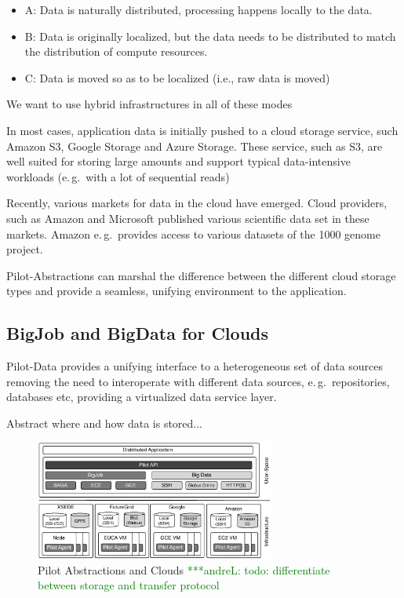 \documentclass[times]{cpeauth}
\newcommand{\alnote}[1]{ {\textcolor{green} { ***andreL: #1 }}}
\newcommand{\alnote}[1]{}
\begin{document}
\begin{itemize}
\item A: Data is naturally distributed, processing happens locally to the data. 
\item B: Data is originally localized, but the data needs to be distributed to match the distribution of compute resources.
\item C: Data is moved so as to be localized (i.e., raw data is moved)
\end{itemize}
We want to use hybrid infrastructures in all of these modes 



In most cases, application data is initially pushed to a cloud storage 
service, such Amazon S3, Google Storage and Azure Storage. These service, such 
as S3, are well suited for storing large amounts and support typical 
data-intensive workloads (e.\,g.\ with a lot of sequential reads)

Recently, various markets for data in the cloud have emerged. Cloud providers,
such as Amazon and Microsoft published various scientific data set in these
markets. Amazon e.\,g.\ provides access to various datasets of the 1000 genome
project.



Pilot-Abstractions can marshal the difference between the different cloud storage types and provide a seamless, unifying environment to the application.


\subsection{BigJob and BigData for Clouds}

Pilot-Data provides a unifying interface to a heterogeneous set of data 
sources removing the need to interoperate with different data sources, e.\,g.\ 
repositories, databases etc, providing a virtualized data service layer.

Abstract where and how data is stored...



\begin{figure}[t]
	\centering
		\includegraphics[width=0.7\textwidth]{figures/cloud_pilot_job.pdf}
	\caption{Pilot Abstractions and Clouds\alnote{todo: differentiate between 
	storage and transfer protocol}}
	\label{fig:figures_cloud_pilot_job}
\end{figure}
\end{document}
